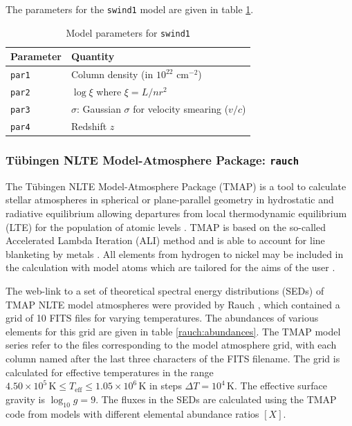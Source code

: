 				The parameters for the \texttt{swind1} model are given in table \ref{param:swind1}.
				\begin{table}[h!]
					\centering
					\caption{Model parameters for \texttt{swind1}}
					\label{param:swind1}
					\begin{tabular}{|p{3cm}|p{10cm}|}
						\hline
						\textbf{Parameter} & \textbf{Quantity} \\ \hline
						{\texttt{par1}} & {Column density (in $10^{22}$ cm$^{-2}$)} \\ \hline
						{\texttt{par2}} & {$\log{\xi}$ where $\xi=L/nr^2$} \\ \hline
						{\texttt{par3}} & {$\sigma$: Gaussian $\sigma$ for velocity smearing ($v/c$)} \\ \hline
						{\texttt{par4}} & {Redshift $z$} \\ \hline
					\end{tabular}
				\end{table}
			
			\subsubsection{T\"{u}bingen NLTE Model-Atmosphere Package: \texttt{rauch}}
				The T\"{u}bingen NLTE Model-Atmosphere Package (TMAP) is a tool to calculate stellar atmospheres in spherical or plane-parallel geometry in hydrostatic and radiative equilibrium allowing departures from local thermodynamic equilibrium (LTE) for the population of atomic levels \cite{wernerDreizler}. TMAP is based on the so-called Accelerated Lambda Iteration (ALI) method and is able to account for line blanketing by metals \cite{rauchALI}. All elements from hydrogen to nickel may be included in the calculation with model atoms which are tailored for the aims of the user \cite{wernerTMAP}.
				
				The web-link to a set of theoretical spectral energy distributions (SEDs) of TMAP NLTE model atmospheres were provided by Rauch \cite{rauchFITS}, which contained a grid of 10 FITS files for varying temperatures. The abundances of various elements for this grid are given in table \ref{rauch:abundances}. The TMAP model series refer to the files corresponding to the model atmosphere grid, with each column named after the last three characters of the FITS filename. The grid is calculated for effective temperatures in the range $4.50\times 10^5\,\text{K}\leqslant T_\text{eff}\leqslant 1.05\times 10^6\,\text{K}$ in steps $\Delta T=10^4\,\text{K}$. The effective surface gravity is $\log_{10}{g}=9$. The fluxes in the SEDs are calculated using the TMAP code from models with different elemental abundance ratios $[X]$.
				
